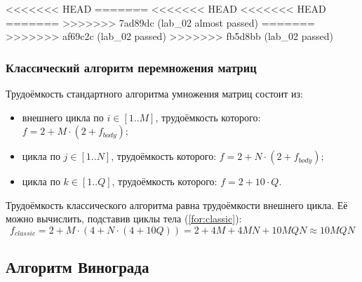 <<<<<<< HEAD
\newpage
=======
<<<<<<< HEAD
<<<<<<< HEAD
\newpage
=======
>>>>>>> 7ad89dc (lab_02 almost passed)
=======
\newpage
>>>>>>> af69c2c (lab_02 passed)
>>>>>>> fb5d8bb (lab_02 passed)
\subsubsection{Классический алгоритм перемножения матриц}

Трудоёмкость стандартного алгоритма умножения матриц состоит из:

\begin{itemize}
	\item внешнего цикла по $i \in [1..M]$, трудоёмкость которого: $f = 2 + M \cdot (2 + f_{body})$;
	\item цикла по $j \in [1..N]$, трудоёмкость которого: $f = 2 + N \cdot (2 + f_{body})$;
	\item цикла по $k \in [1..Q]$, трудоёмкость которого: $f = 2 + 10 \cdot Q$.
\end{itemize}

Трудоёмкость классического алгоритма равна трудоёмкости внешнего цикла.
Её можно вычислить, подставив циклы тела (\ref{for:classic}):
\begin{equation}
	\label{for:classic}
	f_{classic} = 2 + M \cdot (4 + N \cdot (4 + 10Q)) = 2 + 4M + 4MN + 10MQN \approx 10MQN
\end{equation}

\subsection{Алгоритм Винограда}

